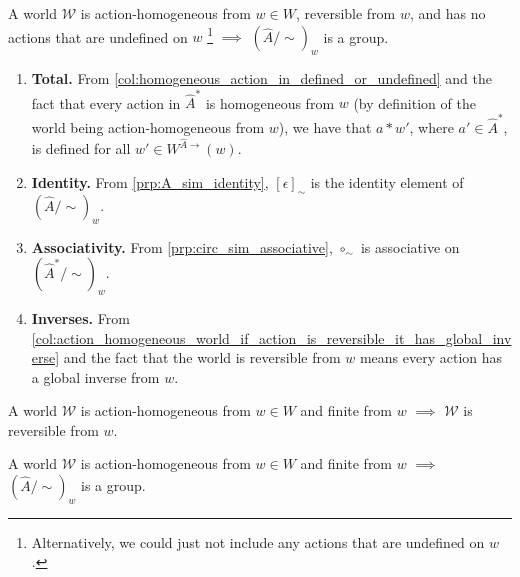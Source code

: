 \begin{propositionE}
    A world $\mathscr{W}$ is action-homogeneous from $w \in W$, reversible from $w$, and has no actions that are undefined on $w$ \footnote{
    Alternatively, we could just not include any actions that are undefined on $w$.
    }  $\implies$ $(\hat{A}/\sim)_{w}$ is a group.
\end{propositionE}
\begin{proofE}
\begin{enumerate}
    \item \textbf{Total.}
    From \cref{col:homogeneous_action_in_defined_or_undefined} and the fact that every action in $\hat{A}^{*}$ is homogeneous from $w$ (by definition of the world being action-homogeneous from $w$), we have that $a \ast w'$, where $a' \in \hat{A}^{*}$, is defined for all $w' \in W^{\hat{A}\to}(w)$.

    \item \textbf{Identity.}
    From \cref{prp:A_sim_identity}, $[\epsilon]_{\sim}$ is the identity element of $(\hat{A}/\sim)_{w}$.

    \item \textbf{Associativity.}
    From \cref{prp:circ_sim_associative}, $\circ_{\sim}$ is associative on $(\hat{A}^{*}/\sim)_{w}$.

    \item \textbf{Inverses.}
    From \cref{col:action_homogeneous_world_if_action_is_reversible_it_has_global_inverse} and the fact that the world is reversible from $w$ means every action has a global inverse from $w$.
\end{enumerate}
\end{proofE}

\begin{propositionE}
    A world $\mathscr{W}$ is action-homogeneous from $w \in W$ and finite from $w$ $\implies$ $\mathscr{W}$ is reversible from $w$.
\end{propositionE}
\begin{proofE}
\end{proofE}

\begin{corollary}
    A world $\mathscr{W}$ is action-homogeneous from $w \in W$ and finite from $w$ $\implies$ $(\hat{A}/\sim)_{w}$ is a group.
\end{corollary}


